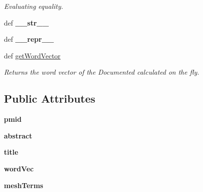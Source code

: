 \begin{DoxyCompactItemize}
\begin{DoxyCompactList}\small\item\em Evaluating equality. \end{DoxyCompactList}\item 
\hypertarget{classgographer_1_1_document_1_1_document_af37ff83e037f643d7f044fed751c1135}{def {\bfseries \-\_\-\-\_\-str\-\_\-\-\_\-}}\label{classgographer_1_1_document_1_1_document_af37ff83e037f643d7f044fed751c1135}

\item 
\hypertarget{classgographer_1_1_document_1_1_document_aeae37bd12ea047c5fd70d35649674c9e}{def {\bfseries \-\_\-\-\_\-repr\-\_\-\-\_\-}}\label{classgographer_1_1_document_1_1_document_aeae37bd12ea047c5fd70d35649674c9e}

\item 
def \hyperlink{classgographer_1_1_document_1_1_document_a22cdc06726bc062318a7a1fe0247bec2}{get\-Word\-Vector}
\begin{DoxyCompactList}\small\item\em Returns the word vector of the Documented calculated on the fly. \end{DoxyCompactList}\end{DoxyCompactItemize}
\subsection*{Public Attributes}
\begin{DoxyCompactItemize}
\item 
\hypertarget{classgographer_1_1_document_1_1_document_acc59350289c5fc1684a96fa8fa45dd92}{{\bfseries pmid}}\label{classgographer_1_1_document_1_1_document_acc59350289c5fc1684a96fa8fa45dd92}

\item 
\hypertarget{classgographer_1_1_document_1_1_document_a5a4b8b8e08186d67f6f20aa2feafeade}{{\bfseries abstract}}\label{classgographer_1_1_document_1_1_document_a5a4b8b8e08186d67f6f20aa2feafeade}

\item 
\hypertarget{classgographer_1_1_document_1_1_document_a325bb4b64aae9c8ba085ba624ba782be}{{\bfseries title}}\label{classgographer_1_1_document_1_1_document_a325bb4b64aae9c8ba085ba624ba782be}

\item 
\hypertarget{classgographer_1_1_document_1_1_document_af4f3aef2710854f0e80e313c3b6a0fc7}{{\bfseries word\-Vec}}\label{classgographer_1_1_document_1_1_document_af4f3aef2710854f0e80e313c3b6a0fc7}

\item 
\hypertarget{classgographer_1_1_document_1_1_document_a57ac477c606ee5087a953d7f1059d4cb}{{\bfseries mesh\-Terms}}\label{classgographer_1_1_document_1_1_document_a57ac477c606ee5087a953d7f1059d4cb}

\end{DoxyCompactItemize}


